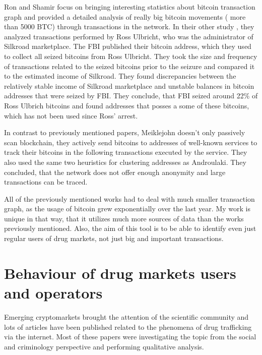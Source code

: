 \documentclass[
  digital, %
  table,   %
  lof,     %
  lot,     %
  oneside
]{fithesis3}
\begin{document}
Ron and Shamir \parencite{ron2013quantitative} focus on bringing
interesting statistics about bitcoin transaction graph
and provided a detailed analysis of really big bitcoin movements ( more than 5000 BTC) 
through transactions in the network.
In their other study \parencite{ron2014did}, they analyzed transactions performed by Ross Ulbricht,
who was the administrator of Silkroad marketplace.
The FBI published their bitcoin address, which they used to collect all seized bitcoins from Ross Ulbricht.
They took the size and frequency of transactions related to the seized bitcoins prior to the seizure and compared it to the estimated income of Silkroad. They found discrepancies between the
relatively stable income of Silkroad marketplace and unstable balances in bitcoin addresses
that were seized by FBI. They conclude, that FBI seized around 22\% of Ross Ulbrich bitcoins
and found addresses that posses a some of these bitcoins, which has not been used since Ross' arrest.

In contrast to previously mentioned papers, Meiklejohn \parencite{meiklejohn2013fistful} 
doesn't only passively scan blockchain, they actively send bitcoins to addresses of
well-known services to track their bitcoins in the following transactions executed by the service.
They also used the same two heuristics for clustering addresses
as Androulaki. \parencite{androulaki2013evaluating}
They concluded, that the network does not offer enough anonymity and large transactions can be traced.

All of the previously mentioned works had to deal with much smaller transaction graph, as the usage of bitcoin grew exponentially over the last year. 
My work is unique in that way, that it utilizes much more sources of data than the works previously mentioned. Also, the aim of this tool is to be able
to identify even just regular users of drug markets, not just big and important transactions.

\section{Behaviour of drug markets users and operators}

Emerging cryptomarkets brought the attention of the scientific community
and lots of articles have been published related to the phenomena of drug trafficking via the internet.
Most of these papers were investigating the topic from the social
and criminology perspective and performing qualitative analysis.
\parencite{aldridge2014not}
\parencite{barratt2014use}
\parencite{christin2013traveling}
\parencite{dolliver2015criminogenic}
\parencite{van2013silk}
\parencite{walsh2011drugs}
\parencite{martin2014lost}
\end{document}
